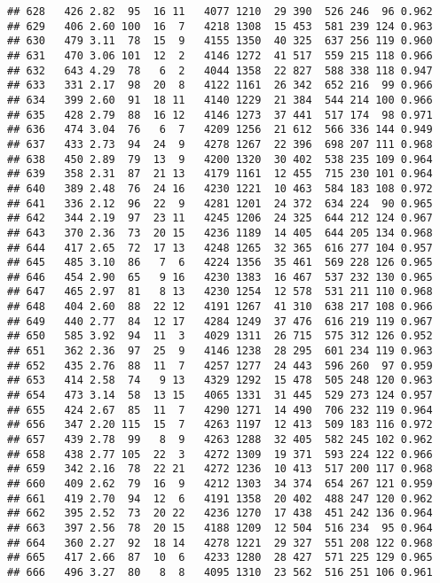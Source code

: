 \documentclass[]{article}
\begin{document}
\begin{verbatim}
## 628   426 2.82  95  16 11   4077 1210  29 390  526 246  96 0.962
## 629   406 2.60 100  16  7   4218 1308  15 453  581 239 124 0.963
## 630   479 3.11  78  15  9   4155 1350  40 325  637 256 119 0.960
## 631   470 3.06 101  12  2   4146 1272  41 517  559 215 118 0.966
## 632   643 4.29  78   6  2   4044 1358  22 827  588 338 118 0.947
## 633   331 2.17  98  20  8   4122 1161  26 342  652 216  99 0.966
## 634   399 2.60  91  18 11   4140 1229  21 384  544 214 100 0.966
## 635   428 2.79  88  16 12   4146 1273  37 441  517 174  98 0.971
## 636   474 3.04  76   6  7   4209 1256  21 612  566 336 144 0.949
## 637   433 2.73  94  24  9   4278 1267  22 396  698 207 111 0.968
## 638   450 2.89  79  13  9   4200 1320  30 402  538 235 109 0.964
## 639   358 2.31  87  21 13   4179 1161  12 455  715 230 101 0.964
## 640   389 2.48  76  24 16   4230 1221  10 463  584 183 108 0.972
## 641   336 2.12  96  22  9   4281 1201  24 372  634 224  90 0.965
## 642   344 2.19  97  23 11   4245 1206  24 325  644 212 124 0.967
## 643   370 2.36  73  20 15   4236 1189  14 405  644 205 134 0.968
## 644   417 2.65  72  17 13   4248 1265  32 365  616 277 104 0.957
## 645   485 3.10  86   7  6   4224 1356  35 461  569 228 126 0.965
## 646   454 2.90  65   9 16   4230 1383  16 467  537 232 130 0.965
## 647   465 2.97  81   8 13   4230 1254  12 578  531 211 110 0.968
## 648   404 2.60  88  22 12   4191 1267  41 310  638 217 108 0.966
## 649   440 2.77  84  12 17   4284 1249  37 476  616 219 119 0.967
## 650   585 3.92  94  11  3   4029 1311  26 715  575 312 126 0.952
## 651   362 2.36  97  25  9   4146 1238  28 295  601 234 119 0.963
## 652   435 2.76  88  11  7   4257 1277  24 443  596 260  97 0.959
## 653   414 2.58  74   9 13   4329 1292  15 478  505 248 120 0.963
## 654   473 3.14  58  13 15   4065 1331  31 445  529 273 124 0.957
## 655   424 2.67  85  11  7   4290 1271  14 490  706 232 119 0.964
## 656   347 2.20 115  15  7   4263 1197  12 413  509 183 116 0.972
## 657   439 2.78  99   8  9   4263 1288  32 405  582 245 102 0.962
## 658   438 2.77 105  22  3   4272 1309  19 371  593 224 122 0.966
## 659   342 2.16  78  22 21   4272 1236  10 413  517 200 117 0.968
## 660   409 2.62  79  16  9   4212 1303  34 374  654 267 121 0.959
## 661   419 2.70  94  12  6   4191 1358  20 402  488 247 120 0.962
## 662   395 2.52  73  20 22   4236 1270  17 438  451 242 136 0.964
## 663   397 2.56  78  20 15   4188 1209  12 504  516 234  95 0.964
## 664   360 2.27  92  18 14   4278 1221  29 327  551 208 122 0.968
## 665   417 2.66  87  10  6   4233 1280  28 427  571 225 129 0.965
## 666   496 3.27  80   8  8   4095 1310  23 562  516 251 106 0.961

\end{verbatim}
\end{document}
